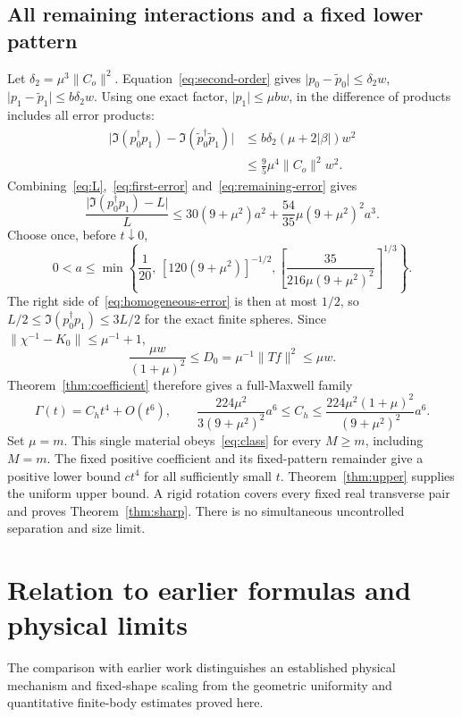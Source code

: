 \documentclass[11pt]{article}
\newcommand{\norm}[1]{\lVert #1\rVert}
\newcommand{\abs}[1]{\lvert #1\rvert}
\begin{document}
\subsection{All remaining interactions and a fixed lower pattern}
Let $\delta_2=\mu^3\norm{C_o}^2$. Equation~\eqref{eq:second-order} gives $\abs{p_0-\widetilde p_0}\leq\delta_2w$, $\abs{p_1-\widetilde p_1}\leq b\delta_2w$. Using one exact factor, $\abs{p_1}\leq\mu bw$, in the difference of products includes all error products:
\begin{align}
 \abs{\Im(p_0^\dagger p_1)-\Im(\widetilde p_0^\dagger\widetilde p_1)}
 &\leq b\delta_2(\mu+2\abs\beta)w^2\nonumber\\
 &\leq\frac95\mu^4\norm{C_o}^2w^2.\label{eq:remaining-error}
\end{align}
Combining~\eqref{eq:L},~\eqref{eq:first-error} and~\eqref{eq:remaining-error} gives
\begin{equation}\label{eq:homogeneous-error}
 \frac{\abs{\Im(p_0^\dagger p_1)-L}}{L}
 \leq30(9+\mu^2)a^2+\frac{54}{35}\mu(9+\mu^2)^2a^3.
\end{equation}
Choose once, before $t\downarrow0$,
\begin{equation}\label{eq:a-choice}
 0<a\leq\min\left\{\frac1{20},\,[120(9+\mu^2)]^{-1/2},
 \left[\frac{35}{216\mu(9+\mu^2)^2}\right]^{1/3}\right\}.
\end{equation}
The right side of~\eqref{eq:homogeneous-error} is then at most $1/2$, so $L/2\leq\Im(p_0^\dagger p_1)\leq3L/2$ for the exact finite spheres. Since $\norm{\chi^{-1}-K_0}\leq\mu^{-1}+1$,
\[
 \frac{\mu w}{(1+\mu)^2}\leq D_0=\mu^{-1}\norm{Tf}^2\leq\mu w.
\]
Theorem~\ref{thm:coefficient} therefore gives a full-Maxwell family
\begin{equation}\label{eq:homogeneous-C}
 \Gamma(t)=C_ht^4+O(t^6),\qquad
 \frac{224\mu^2}{3(9+\mu^2)^2}a^6
 \leq C_h\leq\frac{224\mu^2(1+\mu)^2}{(9+\mu^2)^2}a^6.
\end{equation}
Set $\mu=m$. This single material obeys~\eqref{eq:class} for every $M\geq m$, including $M=m$. The fixed positive coefficient and its fixed-pattern remainder give a positive lower bound $ct^4$ for all sufficiently small $t$. Theorem~\ref{thm:upper} supplies the uniform upper bound. A rigid rotation covers every fixed real transverse pair and proves Theorem~\ref{thm:sharp}. There is no simultaneous uncontrolled separation and size limit.

\section{Relation to earlier formulas and physical limits}\label{sec:prior}
The comparison with earlier work distinguishes an established physical mechanism and fixed-shape scaling from the geometric uniformity and quantitative finite-body estimates proved here.
\end{document}
